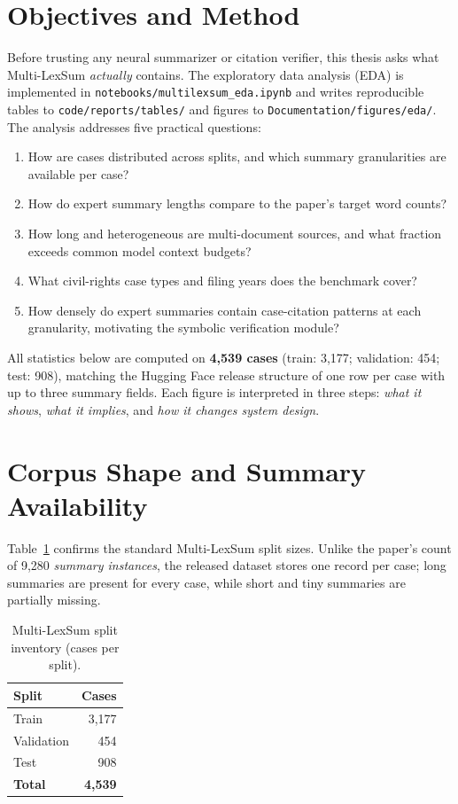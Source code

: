 \label{ch:eda}
\section{Objectives and Method}
\label{sec:eda-objectives}

Before trusting any neural summarizer or citation verifier, this thesis asks what Multi-LexSum \emph{actually} contains. The exploratory data analysis (EDA) is implemented in \texttt{notebooks/multilexsum\_eda.ipynb} and writes reproducible tables to \texttt{code/reports/tables/} and figures to \texttt{Documentation/figures/eda/}. The analysis addresses five practical questions:
\begin{enumerate}
  \item How are cases distributed across splits, and which summary granularities are available per case?
  \item How do expert summary lengths compare to the paper's target word counts?
  \item How long and heterogeneous are multi-document sources, and what fraction exceeds common model context budgets?
  \item What civil-rights case types and filing years does the benchmark cover?
  \item How densely do expert summaries contain case-citation patterns at each granularity, motivating the symbolic verification module?
\end{enumerate}

All statistics below are computed on \textbf{4{,}539 cases} (train: 3{,}177; validation: 454; test: 908), matching the Hugging Face release structure of one row per case with up to three summary fields. Each figure is interpreted in three steps: \emph{what it shows}, \emph{what it implies}, and \emph{how it changes system design}.

\section{Corpus Shape and Summary Availability}
\label{sec:eda-corpus-shape}

Table~\ref{tab:split-inventory} confirms the standard Multi-LexSum split sizes. Unlike the paper's count of 9{,}280 \emph{summary instances}, the released dataset stores one record per case; long summaries are present for every case, while short and tiny summaries are partially missing.

\begin{table}[!t]
\centering
\caption{Multi-LexSum split inventory (cases per split).}
\label{tab:split-inventory}
\begin{tabular}{@{}l r@{}}
\toprule
\textbf{Split} & \textbf{Cases} \\
\midrule
Train      & 3{,}177 \\
Validation & 454 \\
Test       & 908 \\
\midrule
\textbf{Total} & \textbf{4{,}539} \\
\bottomrule
\end{tabular}
\end{table}

